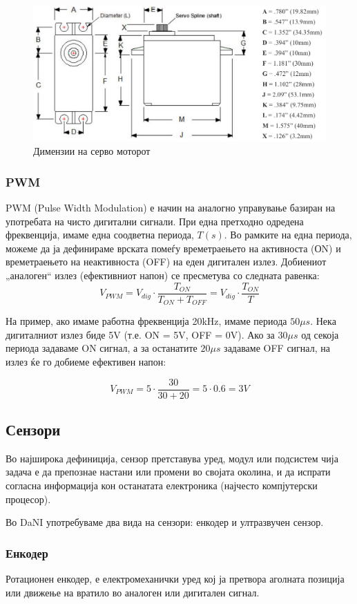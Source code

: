 \documentclass{article}
\begin{document}
\begin{figure}[H]
\includegraphics[width=0.75\linewidth]{./images/servo_schematic.png}
\centering
\caption{Димензии на серво моторот}
\label{fig:servo_schematic.png}
\end{figure}

\subsubsection{PWM}
PWM (Pulse Width Modulation) е начин на аналогно управување базиран на употребата на чисто дигитални сигнали. При една претходно одредена фреквенција, имаме една соодветна периода, $T(s)$. Во рамките на една периода, можеме да ја дефинираме врската помеѓу времетраењето на активноста (ОN) и времетраењето на неактивноста (OFF) на еден дигитален излез. Добиениот „аналоген“ излез (ефективниот напон) се пресметува со следната равенка:\\

$$ V_{PWM} = V_{dig} \cdot \frac{T_{ON}}{T_{ON} + T_{OFF}} = V_{dig} \cdot \frac{T_{ON}}{T} $$

На пример, ако имаме работна фреквенција 20kHz, имаме периода $50\mu s$. Нека дигиталниот излез биде 5V (т.е. ON = 5V, OFF = 0V). Ако за $30\mu s$ од секоја периода задаваме ON сигнал, а за останатите $20\mu s$ задаваме OFF сигнал, на излез ќе го добиеме ефективен напон:

$$ V_{PWM} = 5 \cdot \frac{30}{30+20} = 5 \cdot 0.6 = 3V $$

\subsection{Сензори}
Во најширока дефиниција, сензор претставува уред, модул или подсистем чија задача е да препознае настани или промени во својата околина, и да испрати согласна информација кон останатата електроника (најчесто компјутерски процесор).

Во DaNI употребуваме два вида на сензори: енкодер и ултразвучен сензор.

\subsubsection{Енкодер}
Ротационен енкодер, е електромеханички уред кој ја претвора аголната позиција или движење на вратило во аналоген или дигитален сигнал.
\end{document}
